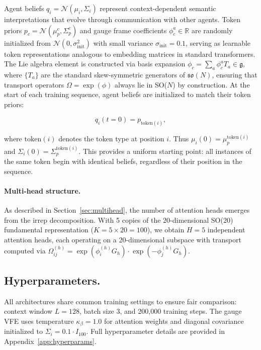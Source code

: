 \documentclass[twoside,11pt]{article}
\begin{document}
Agent beliefs $q_i = \mathcal{N}(\mu_i, \Sigma_i)$ represent context-dependent semantic interpretations that evolve through communication with other agents. Token priors $p_c = \mathcal{N}(\mu_p^c, \Sigma_p^c)$ and gauge frame coefficients $\phi_c^a \in \mathbb{R}$ are randomly initialized from $\mathcal{N}(0, \sigma_{\text{init}}^2)$ with small variance $\sigma_{\text{init}} = 0.1$, serving as learnable token representations analogous to embedding matrices in standard transformers. The Lie algebra element is constructed via basis expansion $\phi_c = \sum_a \phi_c^a T_a \in \mathfrak{g}$, where $\{T_a\}$ are the standard skew-symmetric generators of $\mathfrak{so}(N)$, ensuring that transport operators $\Omega = \exp(\phi)$ always lie in SO($N$) by construction. At the start of each training sequence, agent beliefs are initialized to match their token priors:

\begin{equation}
q_i(t=0) = p_{\text{token}(i)},
\label{eq:belief_init}
\end{equation}

where $\text{token}(i)$ denotes the token type at position $i$. Thus $\mu_i(0) = \mu_p^{\text{token}(i)}$ and $\Sigma_i(0) = \Sigma_p^{\text{token}(i)}$. This provides a uniform starting point: all instances of the same token begin with identical beliefs, regardless of their position in the sequence.

\paragraph{Multi-head structure.}

As described in Section~\ref{sec:multihead}, the number of attention heads emerges from the irrep decomposition. With 5 copies of the 20-dimensional SO(20) fundamental representation ($K = 5 \times 20 = 100$), we obtain $H = 5$ independent attention heads, each operating on a 20-dimensional subspace with transport computed via $\Omega_{ij}^{(h)} = \exp(\phi_i^{(h)} G_h) \cdot \exp(-\phi_j^{(h)} G_h)$.

\subsection{Hyperparameters.}

All architectures share common training settings to ensure fair comparison: context window $L=128$, batch size 3, and 200,000 training steps. The gauge VFE uses temperature $\kappa_\beta = 1.0$ for attention weights and diagonal covariance initialized to $\Sigma_i = 0.1 \cdot I_{100}$. Full hyperparameter details are provided in Appendix~\ref{app:hyperparams}.
\end{document}
